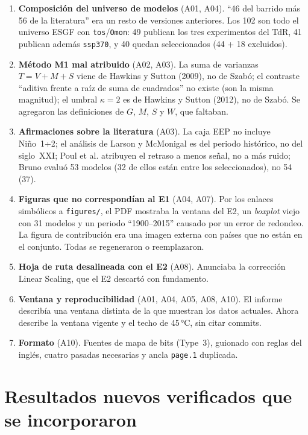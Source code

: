 \begin{enumerate}[leftmargin=1.5em]
\item \textbf{Composición del universo de modelos} (A01, A04). ``46 del barrido más 56 de la literatura'' era un resto de versiones anteriores. Los 102 son todo el universo ESGF con \texttt{tos}/\texttt{Omon}: 49 publican los tres experimentos del TdR, 41 publican además \texttt{ssp370}, y 40 quedan seleccionados (44 + 18 excluidos).
\item \textbf{Método M1 mal atribuido} (A02, A03). La suma de varianzas $T=V+M+S$ viene de Hawkins y Sutton (2009), no de Szabó; el contraste ``aditiva frente a raíz de suma de cuadrados'' no existe (son la misma magnitud); el umbral $\kappa=2$ es de Hawkins y Sutton (2012), no de Szabó. Se agregaron las definiciones de $G$, $M$, $S$ y $W$, que faltaban.
\item \textbf{Afirmaciones sobre la literatura} (A03). La caja EEP no incluye Niño~1+2; el análisis de Larson y McMonigal es del periodo histórico, no del siglo~XXI; Poul et al. atribuyen el retraso a menos señal, no a más ruido; Bruno evaluó 53 modelos (32 de ellos están entre los seleccionados), no 54 (37).
\item \textbf{Figuras que no correspondían al E1} (A04, A07). Por los enlaces simbólicos a \texttt{figures/}, el PDF mostraba la ventana del E2, un \emph{boxplot} viejo con 31 modelos y un periodo ``1900--2015'' causado por un error de redondeo. La figura de contribución era una imagen externa con países que no están en el conjunto. Todas se regeneraron o reemplazaron.
\item \textbf{Hoja de ruta desalineada con el E2} (A08). Anunciaba la corrección Linear Scaling, que el E2 descartó con fundamento.
\item \textbf{Ventana y reproducibilidad} (A01, A04, A05, A08, A10). El informe describía una ventana distinta de la que muestran los datos actuales. Ahora describe la ventana vigente y el techo de 45\,°C, sin citar commits.
\item \textbf{Formato} (A10). Fuentes de mapa de bits (Type~3), guionado con reglas del inglés, cuatro pasadas necesarias y ancla \texttt{page.1} duplicada.
\end{enumerate}

\section{Resultados nuevos verificados que se incorporaron}


